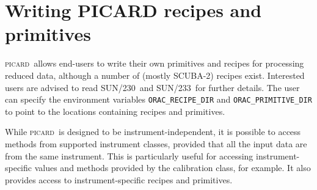 \documentclass[twoside,11pt]{article}
\newcommand{\xref}[3]{#1}
\renewcommand{\_}{\texttt{\symbol{95}}}
\newcommand{\oracsun}{\xref{SUN/230}{sun230}{}}
\newcommand{\oracprogsun}{\xref{SUN/233}{sun233}{}}
\newcommand{\picard}{\textsc{picard}}
\begin{document}
\section{Writing PICARD recipes and primitives\label{se:write}}

\picard\ allows end-users to write their own primitives and recipes
for processing reduced data, although a number of (mostly SCUBA-2)
recipes exist. Interested users are advised to read \oracsun\ and
\oracprogsun\ for further details. The user can specify the
environment variables \verb+ORAC_RECIPE_DIR+ and
\verb+ORAC_PRIMITIVE_DIR+ to point to the locations containing recipes
and primitives.

While \picard\ is designed to be instrument-independent, it is
possible to access methods from supported instrument classes, provided
that all the input data are from the same instrument. This is
particularly useful for accessing instrument-specific values and
methods provided by the calibration class, for example. It also
provides access to instrument-specific recipes and primitives.
\end{document}
